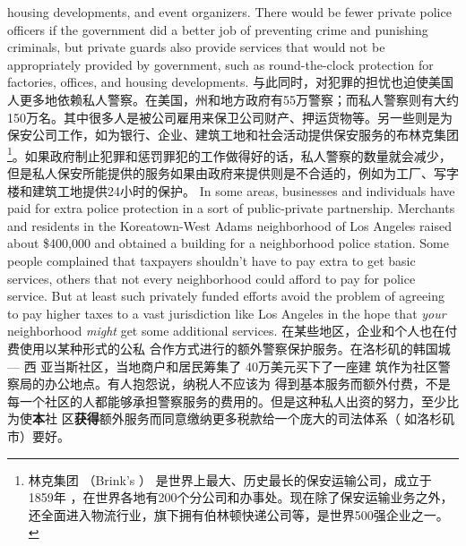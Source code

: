 \begin{paracol}{2}
housing developments, and event organizers. There would be
fewer private police officers if the government did a better job
of preventing crime and punishing criminals, but private
guards also provide services that would not be appropriately
provided by government, such as round-the-clock protection
for factories, offices, and housing developments.
\switchcolumn
与此同时，对犯罪的担忧也迫使美国人更多地依赖私人警察。在美国，州和地方政府有55万警察；而私人警察则有大约 150万名。其中很多人是被公司雇用来保卫公司财产、押运货物等。另一些则是为保安公司工作，如为银行、企业、建筑工地和社会活动提供保安服务的布林克集团\footnote{林克集团 （Brink’s ） 是世界上最大、历史最长的保安运输公司，成立于 1859年 ，在世界各地有200个分公司和办事处。现在除了保安运输业务之外，还全面进入物流行业，旗下拥有伯林顿快递公司等，是世界500强企业之一。}。如果政府制止犯罪和惩罚罪犯的工作做得好的话，私人警察的数量就会减少，但是私人保安所能提供的服务如果由政府来提供则是不合适的，例如为工厂、写字楼和建筑工地提供24小时的保护。
\switchcolumn*
In some areas, businesses and individuals have paid for extra
police protection in a sort of public-private partnership. Merchants and residents in the Koreatown-West Adams neighborhood of Los Angeles raised about \$400,000 and obtained a
building for a neighborhood police station. Some people complained that taxpayers shouldn't have to pay extra to get basic
services, others that not every neighborhood could afford to pay
for police service. But at least such privately funded efforts
avoid the problem of agreeing to pay higher taxes to a vast jurisdiction like Los Angeles in the hope that \textit{your} neighborhood
\textit{might} get some additional services.
\switchcolumn
在某些地区，企业和个人也在付费使用以某种形式的公私
合作方式进行的额外警察保护服务。在洛杉矶的韩国城 --- 西
亚当斯社区，当地商户和居民筹集了 40万美元买下了一座建
筑作为社区警察局的办公地点。有人抱怨说，纳税人不应该为
得到基本服务而额外付费，不是每一个社区的人都能够承担警察服务的费用的。但是这种私人出资的努力，至少比为使\textbf{本}社
区\textbf{获得}额外服务而同意缴纳更多税款给一个庞大的司法体系（ 如洛杉矶市）要好。


\end{paracol}
